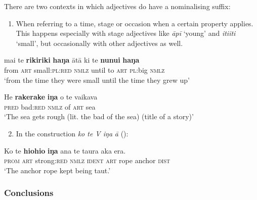 There are two contexts in which adjectives do have a nominalising suffix:

\begin{enumerate}
\item 
When referring to a time, stage or occasion when a certain property applies. This happens especially with stage adjectives like \textit{{\ꞌ}āpī} ‘young’ and \textit{{\ꞌ}iti{\ꞌ}iti} ‘small’, but occasionally with other adjectives as well.

\end{enumerate}

\ea\label{ex:3.109}
\gll mai te \textbf{rikiriki} \textbf{haŋa} {\ꞌ}ātā ki te \textbf{nunui} \textbf{haŋa}\\
from \textsc{art} small:\textsc{pl}:\textsc{red} \textsc{nmlz} until to \textsc{art} \textsc{pl}:big \textsc{nmlz}\\

\glt 
‘from the time they were small until the time they grew up’ \textstyleExampleref{[R236.097]} 
\z

\ea\label{ex:3.110}
\gll He \textbf{rakerake} \textbf{iŋa} o te vaikava\\
\textsc{pred} bad:\textsc{red} \textsc{nmlz} of \textsc{art} sea\\

\glt
‘The sea gets rough (lit. the bad of the sea) (title of a story)’ \textstyleExampleref{[Acts 27:12]}
\z

\begin{enumerate}
\setcounter{enumi}{1}
\item 
In the construction \textit{ko te V iŋa} \textit{\textsf{{\ꞌ}}}\textit{ā} ():

\end{enumerate}

\ea\label{ex:3.111}
\gll Ko te \textbf{hiohio} \textbf{iŋa} {\ꞌ}ana te taura {\ꞌ}aka era.\\
\textsc{prom} \textsc{art} strong:\textsc{red} \textsc{nmlz} \textsc{ident} \textsc{art} rope anchor \textsc{dist}\\

\glt 
‘The anchor rope kept being taut.’ \textstyleExampleref{[R361.061]} 
\z

\subsubsection{Conclusions}\label{sec:3.5.1.7}

